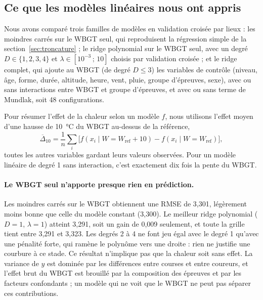 \documentclass[11pt,a4paper]{article}
\begin{document}
\subsection{Ce que les modèles linéaires nous ont appris}\label{sec:resultats_lineaires}

Nous avons comparé trois familles de modèles en validation croisée par lieux : les moindres carrés sur le WBGT seul,
qui reproduisent la régression simple de la section~\ref{sec:troncature} ; le ridge polynomial sur le WBGT seul, avec
un degré $D \in \{1, 2, 3, 4\}$ et $\lambda \in [10^{-3}\,;\,10]$ choisis par validation croisée ; et le ridge
complet, qui ajoute au WBGT (de degré $D \le 3$) les variables de contrôle (niveau, âge, forme, durée, altitude,
heure, vent, pluie, groupe d'épreuves, sexe), avec ou sans interactions entre WBGT et groupe d'épreuves, et avec ou
sans terme de Mundlak, soit 48 configurations.

Pour résumer l'effet de la chaleur selon un modèle $f$, nous utilisons l'effet moyen d'une hausse de 10~°C du WBGT
au-dessus de la référence,
\[
\overline{\Delta}_{10} = \frac1n \sum_i \Big[ f(x_i \mid W = W_{\text{ref}} + 10) - f(x_i \mid W = W_{\text{ref}}) \Big],
\]
toutes les autres variables gardant leurs valeurs observées. Pour un modèle linéaire de degré 1 sans interaction,
c'est exactement dix fois la pente du WBGT.

\paragraph{Le WBGT seul n'apporte presque rien en prédiction.} Les moindres carrés sur le WBGT obtiennent une RMSE de
3,301, légèrement moins bonne que celle du modèle constant (3,300). Le meilleur ridge polynomial ($D = 1$,
$\lambda = 1$) atteint 3,291, soit un gain de 0,009 seulement, et toute la grille tient entre 3,291 et 3,323. Les
degrés 2 à 4 ne font jeu égal avec le degré 1 qu'avec une pénalité forte, qui ramène le polynôme vers une droite :
rien ne justifie une courbure à ce stade. Ce résultat n'implique pas que la chaleur soit sans effet. La variance de
$y$ est dominée par les différences entre courses et entre coureurs, et l'effet brut du WBGT est brouillé par la
composition des épreuves et par les facteurs confondants ; un modèle qui ne voit que le WBGT ne peut pas séparer ces
contributions.
\end{document}
